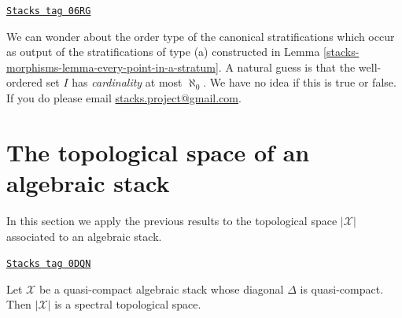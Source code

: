 \begin{remark}
\label{stacks-morphisms-remark-order-type}
\href{https://stacks.math.columbia.edu/tag/06RG}{\texttt{Stacks tag 06RG}}

We can wonder about the order type of the canonical stratifications which
occur as output of the stratifications of type (a) constructed in
Lemma \ref{stacks-morphisms-lemma-every-point-in-a-stratum}.
A natural guess is that the well-ordered set $I$ has
{\it cardinality} at most $\aleph_0$. We have no idea if this is true
or false. If you do please email
\href{mailto:stacks.project@gmail.com}{stacks.project@gmail.com}.
\end{remark}

\section{The topological space of an algebraic stack}
\label{stacks-morphisms-section-topology}
In this section we apply the previous results to the topological
space $|\mathcal{X}|$ associated to an algebraic stack.

\begin{lemma}
\label{stacks-morphisms-lemma-spectral-qc-diagonal-qc}
\href{https://stacks.math.columbia.edu/tag/0DQN}{\texttt{Stacks tag 0DQN}}

Let $\mathcal{X}$ be a quasi-compact algebraic stack
whose diagonal $\Delta$ is quasi-compact.
Then $|\mathcal{X}|$ is a spectral topological space.
\end{lemma}

